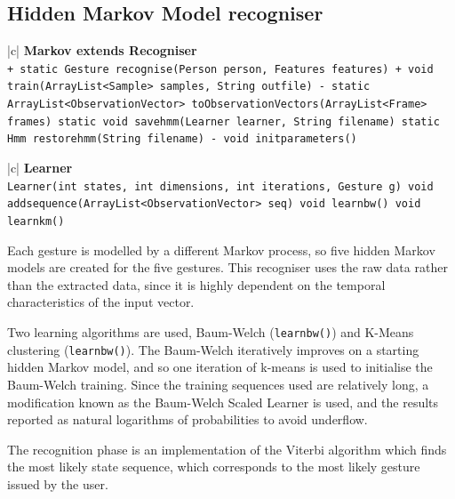 \documentclass[12pt,a4,notitlepage]{report}
\renewcommand{\_}{\texttt{\symbol{95}}}
\newcommand{\<}{\texttt{\symbol{60}}}
\renewcommand{\>}{\texttt{\symbol{62}}}
\newcommand{\class}[1]{\textbf{#1}}
\newcommand{\variable}[1]{\texttt{#1}}
\begin{document}
\subsection{Hidden Markov Model recogniser}

\begin{tabular}{|c|} \hline 
\class{Markov extends Recogniser} \\ \hline
{}
{ \variable{+ static Gesture recognise(Person person, Features features) \newline
+ void train(ArrayList<Sample> samples, String out\_file) \newline
- static ArrayList<ObservationVector> toObservationVectors(ArrayList<Frame> frames) \newline
static void save\_hmm(Learner learner, String filename) \newline
static Hmm restore\_hmm(String filename) \newline
- void init\_parameters()
} } \\ \hline
\end{tabular}

\begin{tabular}{|c|} \hline 
\class{Learner} \\ \hline
{}
{ \variable{Learner(int states, int dimensions, int iterations, Gesture g) \newline
void add\_sequence(ArrayList<ObservationVector> seq) \newline
void learnbw() \newline
void learnkm()
} } \\ \hline
\end{tabular}

Each gesture is modelled by a different Markov process, so five hidden Markov models are created for the five gestures. This recogniser uses the raw data rather than the extracted data, since it is highly dependent on the temporal characteristics of the input vector.

Two learning algorithms are used, Baum-Welch (\variable{learnbw()}) and K-Means clustering (\variable{learnbw()}). The Baum-Welch iteratively improves on a starting hidden Markov model, and so one iteration of k-means is used to initialise the Baum-Welch training. Since the training sequences used are relatively long, a modification known as the Baum-Welch Scaled Learner is used, and the results reported as natural logarithms of probabilities to avoid underflow.

The recognition phase is an implementation of the Viterbi algorithm which finds the most likely state sequence, which corresponds to the most likely gesture issued by the user.
\end{document}
